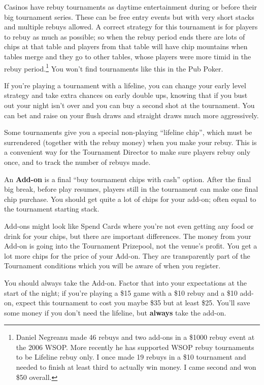 Casinos have rebuy tournaments as daytime entertainment
during or before their big tournament series. These can be free entry
events but with very short stacks and multiple rebuys allowed. A
correct strategy for this tournament is for players
to rebuy as much as possible; so when the rebuy period ends there
are lots of chips at that table and players from that table will
have chip mountains when tables merge and they go to
other tables, whose players were more timid in the rebuy
period.\footnote{Daniel Negreanu made 46 rebuys and two add-ons
  in a \$1000 rebuy event at the 2006 WSOP. More recently he has
  supported WSOP rebuy tournaments to be Lifeline rebuy only. I once
  made 19 rebuys in a \$10 tournament and needed to finish at least
  third to actually win money. I came second and won \$50 overall.} You
won't find tournaments like this in the Pub Poker.

If you're playing a tournament with a lifeline, you can change
your early level strategy and take extra chances on early
double ups, knowing that if you bust out your night isn't over and
you can buy a second shot at the tournament. You can bet and raise
on your flush draws and straight draws much more aggressively.

Some tournaments give you a special non-playing ``lifeline chip'',
which must be surrendered (together with the rebuy money) when you
make your rebuy. This is a convenient way for the Tournament
Director to make sure players rebuy only once, and to track the number
of rebuys made.

An \textbf{Add-on} is a final ``buy tournament chips with cash''
option. After the final big break, before play resumes, players still
in the tournament can make one final chip purchase. You should get
quite a lot of chips for your add-on; often equal to the tournament
starting stack.

Add-ons might look like Spend Cards where you're not even
getting any food or drink for your chips, but there are important
differences. The money from your Add-on is going into the Tournament
Prizepool, not the venue's profit. You get a lot more chips for
the price of your Add-on. They are transparently part of the
Tournament conditions which you will be aware of when you register.

You should always take the Add-on. Factor that into your expectations
at the start of the night; if you're playing a \$15 game with a \$10
rebuy and a \$10 add-on, expect this tournament to cost you maybe
\$35 but at least \$25. You'll save some money if you don't
need the lifeline, but \textbf{always} take the add-on.

